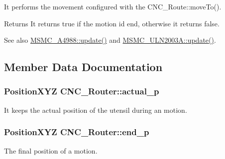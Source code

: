 It performs the movement configured with the C\+N\+C\+\_\+\+Route\+::move\+To(). 

\begin{DoxyReturn}{Returns}
It returns true if the motion id end, otherwise it returns false. 
\end{DoxyReturn}
\begin{DoxySeeAlso}{See also}
\hyperlink{class_m_s_m_c___a4988_a409bea28b42827c8bd7d5e5e318af21d}{M\+S\+M\+C\+\_\+\+A4988\+::update()} and \hyperlink{class_m_s_m_c___u_l_n2003_a_acdf6b6224352a90146e67ee9837d0a6f}{M\+S\+M\+C\+\_\+\+U\+L\+N2003\+A\+::update()}. 
\end{DoxySeeAlso}


\subsection{Member Data Documentation}
\hypertarget{class_c_n_c___router_a5e1d4c6b520762621889824c192e13fb}{
\subsubsection[{actual\+\_\+p}]{\setlength{\rightskip}{0pt plus 5cm}Position\+X\+Y\+Z C\+N\+C\+\_\+\+Router\+::actual\+\_\+p\hspace{0.3cm}{\ttfamily [private]}}}\label{class_c_n_c___router_a5e1d4c6b520762621889824c192e13fb}


It keeps the actual position of the utensil during an motion. 

\hypertarget{class_c_n_c___router_a025944e9009cd9b63b6105c41f4665c3}{
\subsubsection[{end\+\_\+p}]{\setlength{\rightskip}{0pt plus 5cm}Position\+X\+Y\+Z C\+N\+C\+\_\+\+Router\+::end\+\_\+p\hspace{0.3cm}{\ttfamily [private]}}}\label{class_c_n_c___router_a025944e9009cd9b63b6105c41f4665c3}


The final position of a motion. 

